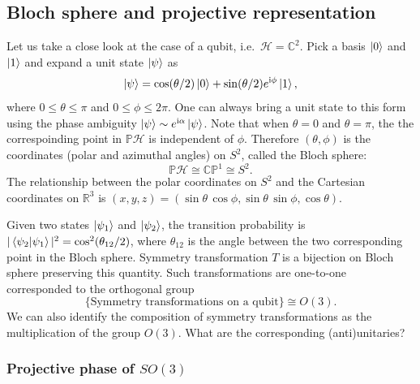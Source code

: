 \documentclass[
]{scrartcl}
\numberwithin{equation}{section}
\theoremstyle{definition}
\theoremstyle{definition}
\theoremstyle{definition}
\theoremstyle{definition}
\theoremstyle{remark}
\begin{document}
\hypertarget{Bloch}{%
\subsection{Bloch sphere and projective representation}\label{Bloch}}

Let us take a close look at the case of a qubit, i.e.~\(\mathcal{H} = \mathbb{C}^2\).
Pick a basis \(\ket{0}\) and \(\ket{1}\) and expand a unit state \(\ket{\psi}\) as
\begin{equation}
  \label{eq:psiexp}
  \ket{\psi} = \cos(\theta/2) \ket{0} + \sin(\theta/2)e^{\mathrm{i}\phi} \ket{1},
\end{equation}
where \(0\le \theta \le \pi\) and \(0 \le \phi \le 2\pi\).
One can always bring a unit state to this form using the phase ambiguity \(\ket{\psi}\sim e^{\mathrm{i}\alpha}\ket{\psi}\).
Note that when \(\theta = 0\) and \(\theta =\pi\), the the correspoinding point in \(\mathbb{P}\mathcal{H}\) is independent of \(\phi\). Therefore \((\theta,\phi)\) is the coordinates (polar and azimuthal angles) on \(S^2\), called the Bloch sphere:
\begin{equation}
  \label{eq:PHCP1}
  \mathbb{P}\mathcal{H} \cong \mathbb{CP}^1 \cong S^2.
\end{equation}
The relationship between the polar coordinates on \(S^2\) and the Cartesian coordinates on \(\mathbb{R}^3\) is \((x,y,z) = (\sin\theta\,\cos\phi,\sin\theta\,\sin\phi,\cos\theta)\).

Given two states \(\ket{\psi_1}\) and \(\ket{\psi_2}\), the transition probability is \(|\braket{\psi_2|\psi_1}|^2 = \cos^2(\theta_{12}/2)\), where \(\theta_{12}\) is the angle between the two corresponding point in the Bloch sphere.
Symmetry transformation \(T\) is a bijection on Bloch sphere preserving this quantity. Such transformations are one-to-one corresponded to the orthogonal group
\begin{equation}
  \label{eq:TisO3}
  \{\text{Symmetry transformations on a qubit}\} \cong O(3).
\end{equation}
We can also identify the composition of symmetry transformations as the multiplication of the group \(O(3)\).
What are the corresponding (anti)unitaries?

\hypertarget{projective-phase-of-so3}{%
\subsubsection{\texorpdfstring{Projective phase of \(SO(3)\)}{Projective phase of SO(3)}}\label{projective-phase-of-so3}}
\end{document}
